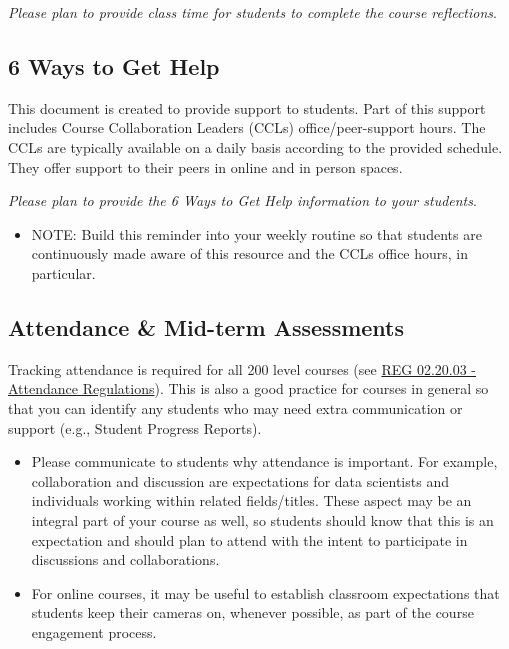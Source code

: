 \documentclass[
]{book}
\providecommand{\tightlist}{%
  \setlength{\itemsep}{0pt}\setlength{\parskip}{0pt}}
\begin{document}
{ \emph{Please plan to provide class time for students to complete the course reflections}. }

\hypertarget{ways-to-get-help}{%
\subsection{6 Ways to Get Help}\label{ways-to-get-help}}

This document is created to provide support to students. Part of this support includes Course Collaboration Leaders (CCLs) office/peer-support hours. The CCLs are typically available on a daily basis according to the provided schedule. They offer support to their peers in online and in person spaces.

{ \emph{Please plan to provide the 6 Ways to Get Help information to your students}. }

\begin{itemize}
\tightlist
\item
  NOTE: Build this reminder into your weekly routine so that students are continuously made aware of this resource and the CCLs office hours, in particular.
\end{itemize}

\hypertarget{attendance-mid-term-assessments}{%
\subsection{Attendance \& Mid-term Assessments}\label{attendance-mid-term-assessments}}

Tracking attendance is required for all 200 level courses (see \href{https://policies.ncsu.edu/regulation/reg-02-20-03-attendance-regulations/}{REG 02.20.03 - Attendance Regulations}). This is also a good practice for courses in general so that you can identify any students who may need extra communication or support (e.g., Student Progress Reports).

\begin{itemize}
\item
  Please communicate to students why attendance is important. For example, collaboration and discussion are expectations for data scientists and individuals working within related fields/titles. These aspect may be an integral part of your course as well, so students should know that this is an expectation and should plan to attend with the intent to participate in discussions and collaborations.
\item
  For online courses, it may be useful to establish classroom expectations that students keep their cameras on, whenever possible, as part of the course engagement process.
\end{itemize}
\end{document}
